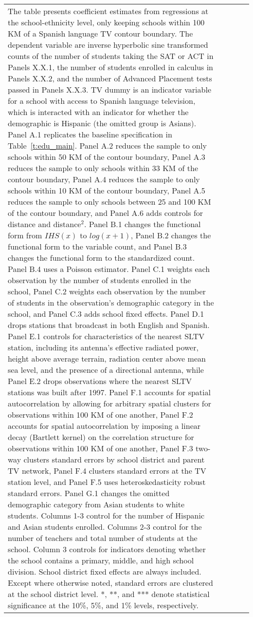 \begin{center}
\begin{footnotesize}
\begin{longtable}{lccccccc}
			\multicolumn{4}{p{30em}}{The table presents coefficient estimates from regressions at the school-ethnicity level, only keeping schools within 100 KM of a Spanish language TV contour boundary. The dependent variable are inverse hyperbolic sine transformed counts of the number of students taking the SAT or ACT in Panels X.X.1, the number of students enrolled in calculus in Panels X.X.2, and the number of Advanced Placement tests passed in Panels X.X.3. TV dummy is an indicator variable for a school with access to Spanish language television, which is interacted with an indicator for whether the demographic is Hispanic (the omitted group is Asians). Panel A.1 replicates the baseline specification in Table~\ref{t:edu_main}. Panel A.2 reduces the sample to only schools within 50 KM of the contour boundary, Panel A.3 reduces the sample to only schools within 33 KM of the contour boundary, Panel A.4 reduces the sample to only schools within 10 KM of the contour boundary, Panel A.5 reduces the sample to only schools between 25 and 100 KM of the contour boundary, and Panel A.6 adds controls for distance and distance$^2$. Panel B.1 changes the functional form from $IHS(x)$ to $log(x+1)$, Panel B.2 changes the functional form to the variable count, and Panel B.3 changes the functional form to the standardized count. Panel B.4 uses a Poisson estimator. Panel C.1 weights each observation by the number of students enrolled in the school, Panel C.2 weights each observation by the number of students in the observation's demographic category in the school, and Panel C.3 adds school fixed effects. Panel D.1 drops stations that broadcast in both English and Spanish. Panel E.1 controls for characteristics of the nearest SLTV station, including its antenna's effective radiated power, height above average terrain, radiation center above mean sea level, and the presence of a directional antenna, while Panel E.2 drops observations where the nearest SLTV stations was built after 1997. Panel F.1 accounts for spatial autocorrelation by allowing for arbitrary spatial clusters for observations within 100 KM of one another, Panel F.2 accounts for spatial autocorrelation by imposing a linear decay (Bartlett kernel) on the correlation structure for observations within 100 KM of one another, Panel F.3 two-way clusters standard errors by school district and parent TV network, Panel F.4 clusters standard errors at the TV station level, and Panel F.5 uses heteroskedasticity robust standard errors. Panel G.1 changes the omitted demographic category from Asian students to white students. Columns 1-3 control for the number of Hispanic and Asian students enrolled. Columns 2-3 control for the number of teachers and total number of students at the school. Column 3 controls for indicators denoting whether the school contains a primary, middle, and high school division. School district fixed effects are always included. Except where otherwise noted, standard errors are clustered at the school district level. *, **, and *** denote statistical significance at the 10\%, 5\%, and 1\% levels, respectively.}
\end{longtable}
\end{footnotesize}
\end{center}

